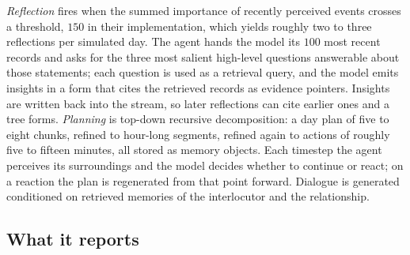\emph{Reflection} fires when the summed importance of recently perceived events crosses a threshold, $150$ in their implementation, which yields roughly two to three reflections per simulated day. The agent hands the model its $100$ most recent records and asks for the three most salient high-level questions answerable about those statements; each question is used as a retrieval query, and the model emits insights in a form that cites the retrieved records as evidence pointers. Insights are written back into the stream, so later reflections can cite earlier ones and a tree forms. \emph{Planning} is top-down recursive decomposition: a day plan of five to eight chunks, refined to hour-long segments, refined again to actions of roughly five to fifteen minutes, all stored as memory objects. Each timestep the agent perceives its surroundings and the model decides whether to continue or react; on a reaction the plan is regenerated from that point forward. Dialogue is generated conditioned on retrieved memories of the interlocutor and the relationship.

\begin{center}
\end{center}

\subsection{What it reports}

